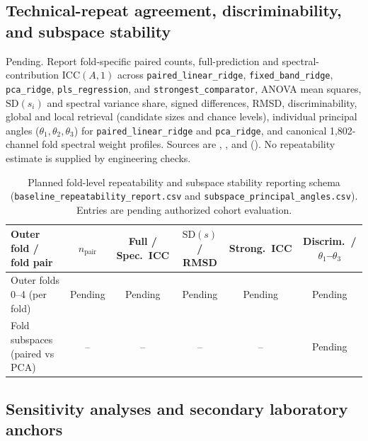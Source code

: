 \documentclass[preprint,12pt]{elsarticle}
\begin{document}
\subsection{Technical-repeat agreement, discriminability, and subspace stability}
\label{subsec:results_repeatability}

Pending. Report fold-specific paired counts, full-prediction and spectral-contribution $\mathrm{ICC}(A,1)$ across \texttt{paired\_linear\_ridge}, \texttt{fixed\_band\_ridge}, \texttt{pca\_ridge}, \texttt{pls\_regression}, and \texttt{strongest\_comparator}, ANOVA mean squares, $\mathrm{SD}(s_i)$ and spectral variance share, signed differences, RMSD, discriminability, global and local retrieval (candidate sizes and chance levels), individual principal angles ($\theta_1, \theta_2, \theta_3$) for \texttt{paired\_linear\_ridge} and \texttt{pca\_ridge}, and canonical 1,802-channel fold spectral weight profiles. Sources are , , and  (). No repeatability estimate is supplied by engineering checks.

\begin{table}[ht]
\centering
\caption{Planned fold-level repeatability and subspace stability reporting schema (\texttt{baseline\_repeatability\_report.csv} and \texttt{subspace\_principal\_angles.csv}). Entries are pending authorized cohort evaluation.}
\label{tab:repeatability_plan}
\footnotesize
\setlength{\tabcolsep}{3.5pt}
\begin{tabularx}{\textwidth}{@{}>{\raggedright\arraybackslash}X c c c c c@{}}
\toprule
Outer fold / fold pair & $n_{\text{pair}}$ & Full / Spec.\ ICC & $\mathrm{SD}(s)$ / RMSD & Strong.\ ICC & Discrim.\ / $\theta_1$--$\theta_3$ \\
\midrule
Outer folds 0--4 (per fold) & Pending & Pending & Pending & Pending & Pending \\
Fold subspaces (paired vs PCA) & -- & -- & -- & -- & Pending \\
\bottomrule
\end{tabularx}
\end{table}

\subsection{Sensitivity analyses and secondary laboratory anchors}
\label{subsec:results_sensitivity}
\end{document}
